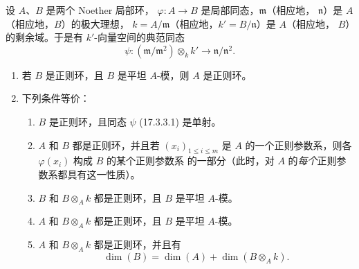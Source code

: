 \begin{proposition}[17.3.3]
\label{0.17.3.3-fr}
设 $A$、$B$ 是两个 Noether 局部环，
$\varphi:A\longrightarrow B$ 是局部同态，$\mathfrak{m}$（相应地，
$\mathfrak{n}$）是 $A$（相应地，$B$）的极大理想，
$k=A/\mathfrak{m}$（相应地，$k'=B/\mathfrak{n}$）是 $A$（相应地，
$B$）的剩余域。于是有 $k'$-向量空间的典范同态
\begin{equation}
\label{0.17.3.3.1-fr}
\tag{17.3.3.1}
  \psi:(\mathfrak{m}/\mathfrak{m}^2)\otimes_k k'
  \longrightarrow\mathfrak{n}/\mathfrak{n}^2.
\end{equation}
\begin{enumerate}
  \item[\rm (i)] 若 $B$ 是正则环，且 $B$ 是平坦 $A$-模，则 $A$ 是正则环。
  \item[\rm (ii)] 下列条件等价：
  \begin{enumerate}
    \item[\rm a)] $B$ 是正则环，且同态 $\psi$ (17.3.3.1) 是单射。
    \item[\rm b)] $A$ 和 $B$ 都是正则环，并且若 $(x_i)_{1\leq i\leq m}$
    是 $A$ 的一个正则参数系，则各 $\varphi(x_i)$ 构成 $B$ 的某个正则参数系
    的一部分（此时，对 $A$ 的\emph{每个}正则参数系都具有这一性质）。
    \item[\rm c)] $B$ 和 $B\otimes_A k$ 都是正则环，且 $B$ 是平坦
    $A$-模。
    \item[\rm d)] $A$ 和 $B\otimes_A k$ 都是正则环，且 $B$ 是平坦
    $A$-模。
    \item[\rm e)] $A$ 和 $B\otimes_A k$ 都是正则环，并且有
    \begin{equation}
    \label{0.17.3.3.2-fr}
    \tag{17.3.3.2}
      \dim(B)=\dim(A)+\dim(B\otimes_A k).
    \end{equation}
  \end{enumerate}
\end{enumerate}
\end{proposition}

